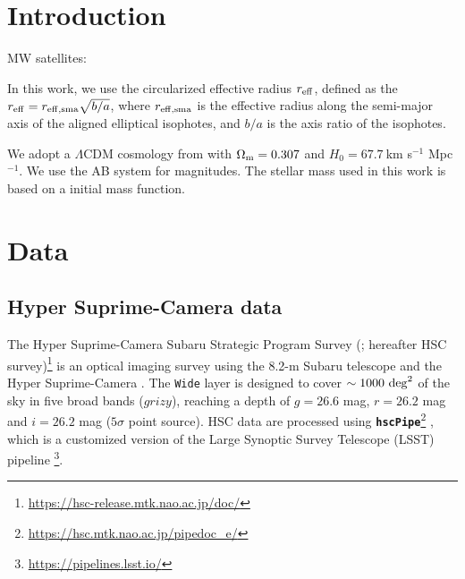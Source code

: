 \documentclass[twocolumn,astrosymb,twocolappendix]{aastex631}
\newcommand{\code}[1]{\textbf{\texttt{#1}}}
\begin{document}
\begin{CJK*}{UTF8}{gbsn}

\begin{abstract}

\end{abstract}



\section{Introduction} \label{sec:intro}
MW satellites: \citep{Nashimoto2022}

In this work, we use the circularized effective radius $r_{\rm eff}$, defined as the $r_{\rm eff} = r_{\rm eff, sma} \sqrt{b/a}$, where $r_{\rm eff, sma}$ is the effective radius along the semi-major axis of the aligned elliptical isophotes, and $b/a$ is the axis ratio of the isophotes.

We adopt a $\Lambda$CDM cosmology from \citet{Planck15} with $\Omega_{\rm m}= 0.307$ and $H_0 = 67.7\ $km s$^{-1}$ Mpc$^{-1}$. We use the AB system \citep{Oke1983} for magnitudes. The stellar mass used in this work is based on a \citet{Chabrier2003} initial mass function.

\section{Data} \label{sec:data}
\subsection{Hyper Suprime-Camera data}
The Hyper Suprime-Camera Subaru Strategic Program Survey (\citealt{Aihara2018}; hereafter HSC survey)\footnote{\url{https://hsc-release.mtk.nao.ac.jp/doc/}} is an optical imaging survey using the 8.2-m Subaru telescope and the Hyper Suprime-Camera \citep{Miyazaki2012, Miyazaki2018}. The \texttt{Wide} layer is designed to cover $\sim 1000\ \rm{deg}^{2}$ of the sky in five broad bands ($grizy$), reaching a depth of $g=26.6$ mag, $r=26.2$ mag and $i=26.2$ mag ($5\sigma$ point source). HSC data are processed using \code{hscPipe}\footnote{\url{https://hsc.mtk.nao.ac.jp/pipedoc_e/}} \citep{Bosch2018}, which is a customized version of the Large Synoptic Survey Telescope (LSST) pipeline \citep{LSST-pipeline}\footnote{\url{https://pipelines.lsst.io/}}. 


\end{CJK*}
\end{document}
